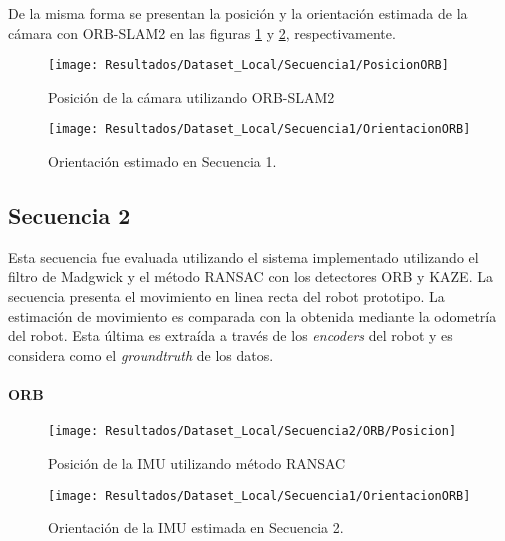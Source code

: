 De la misma forma se presentan la posición y la orientación estimada de la cámara con ORB-SLAM2 en las figuras \ref{imagen:Resultados/Dataset_Local/Secuencia3/PosicionORB} y \ref{imagen:Resultados/Dataset_Local/Secuencia1/OrientacionORB}, respectivamente.	
\begin{figure}[H]
	\centering
	\texttt{[image: Resultados/Dataset\_Local/Secuencia1/PosicionORB]}
	\caption{Posición de la cámara utilizando ORB-SLAM2}
	\label{imagen:Resultados/Dataset_Local/Secuencia3/PosicionORB}
\end{figure}


\begin{figure}[H]
	\centering
	\texttt{[image: Resultados/Dataset\_Local/Secuencia1/OrientacionORB]}
	\caption[Orientación estimada en Secuencia 1 utilizando ORB-SLAM2]{Orientación estimado en Secuencia 1.}
	\label{imagen:Resultados/Dataset_Local/Secuencia1/OrientacionORB}
\end{figure}

\subsection{Secuencia 2}

Esta secuencia fue evaluada utilizando el sistema implementado utilizando el filtro de Madgwick y el método RANSAC con los detectores ORB y KAZE. La secuencia presenta el movimiento en linea recta del robot prototipo. La estimación de movimiento es comparada con la obtenida mediante la odometría del robot. Esta última es extraída a través de los \textit{encoders} del robot y es considera como el \textit{groundtruth} de los datos.



\paragraph{ORB}
	
\begin{figure}[H]
	\centering
	\texttt{[image: Resultados/Dataset\_Local/Secuencia2/ORB/Posicion]}
	\caption{Posición de la IMU utilizando método RANSAC}
	\label{imagen:Resultados/Dataset_Local/Secuencia2/ORB/Posicion}
\end{figure}


\begin{figure}[H]
	\centering
	\texttt{[image: Resultados/Dataset\_Local/Secuencia1/OrientacionORB]}
	\caption[Posición de la IMU utilizando método RANSAC]{Orientación de la IMU estimada en Secuencia 2.}
	\label{imagen:Resultados/Dataset_Local/Secuencia2/ORB/Orientacion}
\end{figure}


